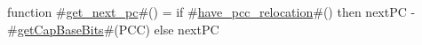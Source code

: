 function #\hyperref[sailRISCVzgetzynextzypc]{get\_next\_pc}#() =
  if #\hyperref[sailRISCVzhavezypcczyrelocation]{have\_pcc\_relocation}#() then nextPC - #\hyperref[sailRISCVzgetCapBaseBits]{getCapBaseBits}#(PCC) else nextPC
